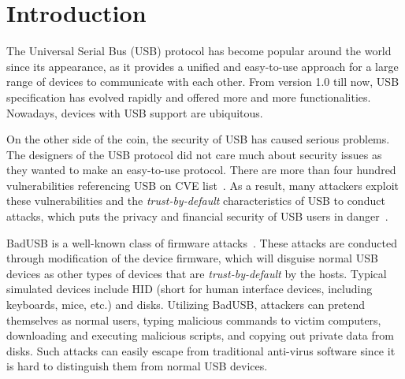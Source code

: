 \section{Introduction}
\label{sec:introduction}

The Universal Serial Bus (USB) protocol has become popular around the world
since its appearance, as it provides a unified and easy-to-use approach for a
large range of devices to communicate with each other.  From version 1.0 till
now, USB specification has evolved rapidly and offered more and more
functionalities.  Nowadays, devices with USB support are ubiquitous.

On the other side of the coin, the security of USB has caused serious problems.
The designers of the USB protocol did not care much about security issues as
they wanted to make an easy-to-use protocol.  There are more than four hundred
vulnerabilities referencing USB on CVE list~\cite{website:CVE-list}.  As a
result, many attackers exploit these vulnerabilities and the
\textit{trust-by-default} characteristics of USB to conduct attacks, which puts
the privacy and financial security of USB users in danger~\cite{sok}.

BadUSB is a well-known class of firmware attacks~\cite{badusb}.  These attacks
are conducted through modification of the device firmware, which will disguise
normal USB devices as other types of devices that are \textit{trust-by-default}
by the hosts.  Typical simulated devices include HID (short for human interface
devices, including keyboards, mice, etc.) and disks.  Utilizing BadUSB,
attackers can pretend themselves as normal users, typing malicious commands to
victim computers, downloading and executing malicious scripts, and copying out
private data from disks.  Such attacks can easily escape from traditional
anti-virus software since it is hard to distinguish them from normal USB
devices.

